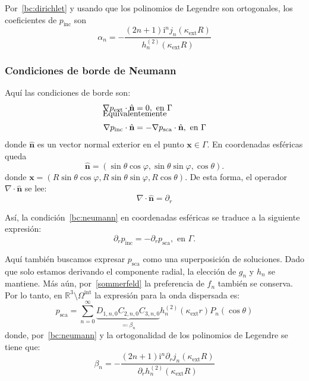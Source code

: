 \documentclass[11pt]{article}
\numberwithin{equation}{section}
\def\R{\mathbb{R}}
\def\x{\textbf{x}}
\def\n{\hat{\textbf{n}}}
\let\i\relax
\def\i{\mathrm{i}}
\def\exterior{\textrm{ext}}
\def\interior{\textrm{int}}
\def\inc{\textrm{inc}}
\def\sca{\textrm{sca}}
\begin{document}
\noindent Por~\eqref{bc:dirichlet} y usando que los polinomios de Legendre son
ortogonales, los coeficientes de \(p_{\inc}\) son
\begin{equation}\label{ext:psca:coef:dirichlet}
	\alpha_n 
	= 
	-\frac
	{
		(2n+1)\i^n j_n(\kappa_{\exterior} R)
	}
	{
		h_n^{(2)}(\kappa_{\exterior} R)
	}
\end{equation}

\subsubsection{Condiciones de borde de Neumann}\label{sssec:a:exterior:neumann}

\noindent Aquí las condiciones de borde son:
\begin{align}
\label{bc:neumann}
	\nabla p_{\exterior}\cdot \n &= 0, \text{ en }
	\Gamma\\[-1em]
	\intertext{Equivalentemente}
	\nabla p_{\inc}\cdot \n &= -\nabla p_{\sca}\cdot \n, \text{ en }
	\Gamma
\end{align}
donde \(\n\) es un vector normal exterior en el punto \(\x\in\Gamma\). En coordenadas
esféricas queda
\begin{equation}\label{n}
	\n = (\sin\theta\cos\varphi, \sin\theta\sin\varphi, \cos\theta).
\end{equation}
donde \(\x = (R\sin\theta\cos\varphi, R\sin\theta\sin\varphi, R\cos\theta)\).
De esta forma, el operador \(\nabla\cdot\n\) se lee:
\begin{equation}
\label{nabla.n}
	\nabla\cdot\n = \partial_{r}
\end{equation}

\noindent Así, la condición~\eqref{bc:neumann} en coordenadas esféricas
se traduce a la siguiente expresión:
\begin{equation}\label{neumann:esfericas}
	\partial_{r} p_{\inc} = - \partial_{r} p_{\sca}, \text{ en } \Gamma.
\end{equation}

\noindent Aquí también buscamos expresar \(p_{\sca}\) como una superposición de
soluciones. Dado que
solo estamos derivando el componente radial, la elección de \(g_n\) y \(h_n\) se
mantiene. Más aún, por~\eqref{sommerfeld} la preferencia de \(f_n\) también se
conserva. Por lo tanto, en \(\R^3\setminus\Omega^{\interior}\) la expresión para
la onda dispersada es:
\begin{equation}
\label{ext:psca:neumann:forma}
	p_{\sca}
	=
	\sum_{n=0}^{\infty}
	\underbrace{D_{1,n,0} C_{2,n,0} C_{3,n,0}}_{\eqqcolon \beta_n}
		h_{n}^{(2)}(\kappa_{\exterior} r)
		P_{n}(\cos\theta)
\end{equation}
donde, por~\eqref{bc:neumann} y la ortogonalidad de los polinomios de Legendre
se tiene que:
\begin{equation}
\label{ext:psca:neumann:coef}
	\beta_n
	=
	-\frac
	{
		(2n+1) \i^n \partial_{r} j_n(\kappa_{\exterior} R)
	}
	{
		\partial_r h_n^{(2)}(\kappa_{\exterior} R)
	}
\end{equation}
\end{document}
